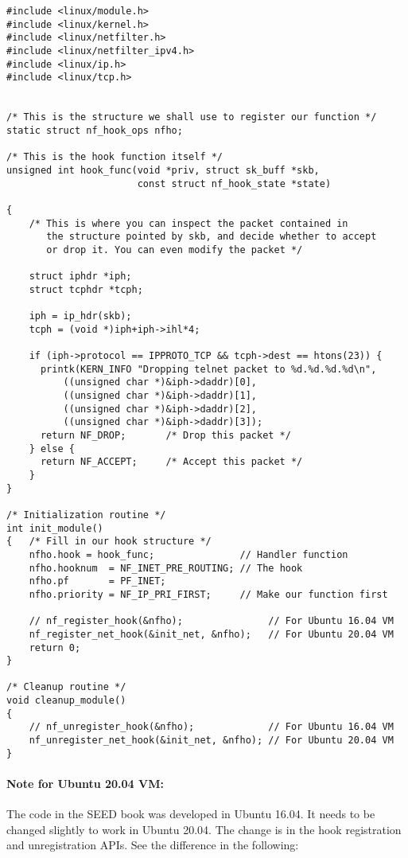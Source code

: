 \begin{lstlisting}
#include <linux/module.h>
#include <linux/kernel.h>
#include <linux/netfilter.h>
#include <linux/netfilter_ipv4.h>
#include <linux/ip.h>
#include <linux/tcp.h>


/* This is the structure we shall use to register our function */
static struct nf_hook_ops nfho;

/* This is the hook function itself */
unsigned int hook_func(void *priv, struct sk_buff *skb, 
                       const struct nf_hook_state *state)

{
    /* This is where you can inspect the packet contained in
       the structure pointed by skb, and decide whether to accept 
       or drop it. You can even modify the packet */
 
    struct iphdr *iph;
    struct tcphdr *tcph;
    
    iph = ip_hdr(skb);
    tcph = (void *)iph+iph->ihl*4;
 
    if (iph->protocol == IPPROTO_TCP && tcph->dest == htons(23)) {
      printk(KERN_INFO "Dropping telnet packet to %d.%d.%d.%d\n",
          ((unsigned char *)&iph->daddr)[0],
          ((unsigned char *)&iph->daddr)[1],
          ((unsigned char *)&iph->daddr)[2],
          ((unsigned char *)&iph->daddr)[3]);
      return NF_DROP;       /* Drop this packet */
    } else {
      return NF_ACCEPT;     /* Accept this packet */
    }
}

/* Initialization routine */
int init_module()
{   /* Fill in our hook structure */
    nfho.hook = hook_func;               // Handler function 
    nfho.hooknum  = NF_INET_PRE_ROUTING; // The hook 
    nfho.pf       = PF_INET;
    nfho.priority = NF_IP_PRI_FIRST;     // Make our function first 

    // nf_register_hook(&nfho);               // For Ubuntu 16.04 VM
    nf_register_net_hook(&init_net, &nfho);   // For Ubuntu 20.04 VM
    return 0;
}

/* Cleanup routine */
void cleanup_module()
{
    // nf_unregister_hook(&nfho);             // For Ubuntu 16.04 VM
    nf_unregister_net_hook(&init_net, &nfho); // For Ubuntu 20.04 VM
}
\end{lstlisting}


\paragraph{Note for Ubuntu 20.04 VM:}
The code in the SEED book was developed in Ubuntu 16.04. It needs to be changed slightly 
to work in Ubuntu 20.04. The change is in the hook registration and 
unregistration APIs. See the difference in the following:


